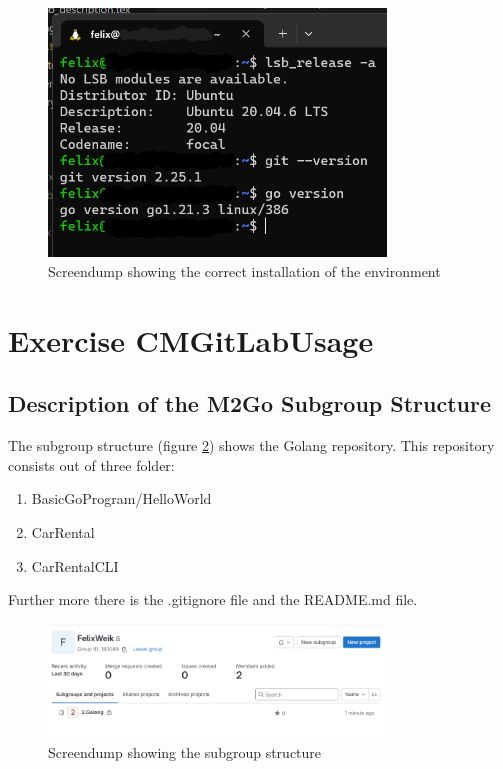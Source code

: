 \begin{figure}[h]
	\centering
	\includegraphics[width=0.8\textwidth]{figures/installation_screendump.png}
	\caption{Screendump showing the correct installation of the environment}
	\label{fig:screendump_installation}
\end{figure}

\section{Exercise CMGitLabUsage}

\subsection{Description of the M2Go Subgroup Structure}
The subgroup structure (figure \ref*{fig:screendump_subgroupStructure}) shows the Golang repository.
This repository consists out of three folder:
\begin{enumerate}
    \item BasicGoProgram/HelloWorld
    \item CarRental
    \item CarRentalCLI
\end{enumerate}
Further more there is the .gitignore file and the README.md file.

\begin{figure}[h]
    \centering
    \includegraphics[width=0.8\textwidth]{figures/goLang/golang_personalSubgroupStructure.png}
    \caption{Screendump showing the subgroup structure}
    \label{fig:screendump_subgroupStructure}
\end{figure}

